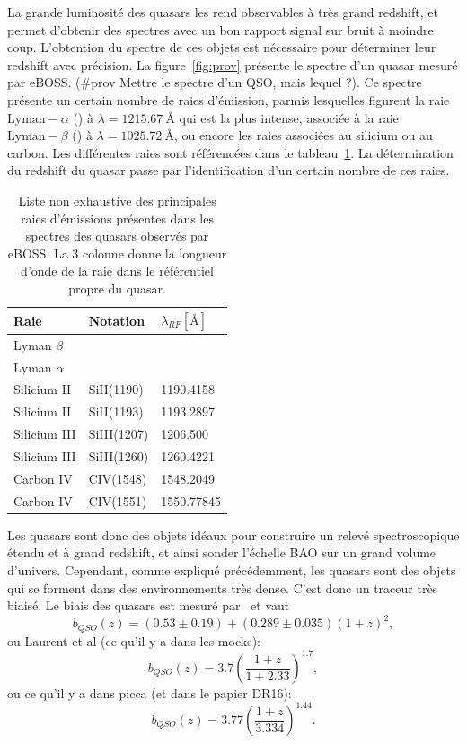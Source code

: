 \documentclass[11pt, twoside, a4paper, openright]{report}
\begin{document}
La grande luminosité des quasars les rend observables à très grand redshift, et permet d'obtenir des spectres avec un bon rapport signal sur bruit à moindre coup. L'obtention du spectre de ces objets est nécessaire pour déterminer leur redshift avec précision. La figure~\ref{fig:prov} présente le spectre d'un quasar mesuré par eBOSS. (\#prov Mettre le spectre d'un QSO, mais lequel ?). Ce spectre présente un certain nombre de raies d'émission, parmis lesquelles figurent la raie $\mathrm{Lyman-}\alpha$ (\lya{}) à $\lambda = \SI{1215.67}{\angstrom}$ qui est la plus intense, associée à la raie  $\mathrm{Lyman-}\beta$ (\lyb{}) à $\lambda = \SI{1025.72}{\angstrom}$, ou encore les raies associées au silicium ou au carbon. Les différentes raies sont référencées dans le tableau~\ref{fig:raies}. La détermination du redshift du quasar passe par l'identification d'un certain nombre de ces raies.
\begin{table}[h]
  \centering
  \caption{Liste non exhaustive des principales raies d'émissions présentes dans les spectres des quasars observés par eBOSS. La 3 colonne donne la longueur d'onde de la raie dans le référentiel propre du quasar.}
  \label{fig:raies}
  \begin{tabular}{lll}
    \toprule
    Raie & Notation & $\lambda_{RF} [\si{\angstrom}]$ \\
    \midrule
    Lyman $\beta$ & & \\
    Lyman $\alpha$ & & \\
    Silicium II & SiII(1190) & 1190.4158 \\
    Silicium II & SiII(1193) & 1193.2897 \\
    Silicium III & SiIII(1207) & 1206.500 \\
    Silicium III & SiIII(1260) & 1260.4221 \\
    Carbon IV & CIV(1548) & 1548.2049 \\
    Carbon IV & CIV(1551) & 1550.77845 \\
    \bottomrule
  \end{tabular}
\end{table}

Les quasars sont donc des objets idéaux pour construire un relevé spectroscopique étendu et à grand redshift, et ainsi sonder l'échelle BAO sur un grand volume d'univers. Cependant, comme expliqué précédemment, les quasars sont des objets qui se forment dans des environnements très dense. C'est donc un traceur très biaisé. Le biais des quasars est mesuré par~\cite{CITE Croom} et vaut
\begin{equation}
  \label{eq:b_qso}
 b_{QSO}(z) = (0.53 \pm 0.19) + (0.289 \pm 0.035)(1 + z)^2 ,
\end{equation}
ou Laurent et al (ce qu'il y a dans les mocks):
\begin{equation}
  \label{eq:b_qso}
b_{QSO}(z) = 3.7 \left(\frac{1+z}{1+2.33}\right)^{1.7} , 
\end{equation} 
ou ce qu'il y a dans picca (et dans le papier DR16):
\begin{equation}
  \label{eq:b_qso}
b_{QSO}(z) = 3.77 ( \frac{1+z}{3.334} )^{1.44} .
\end{equation} 
\end{document}
